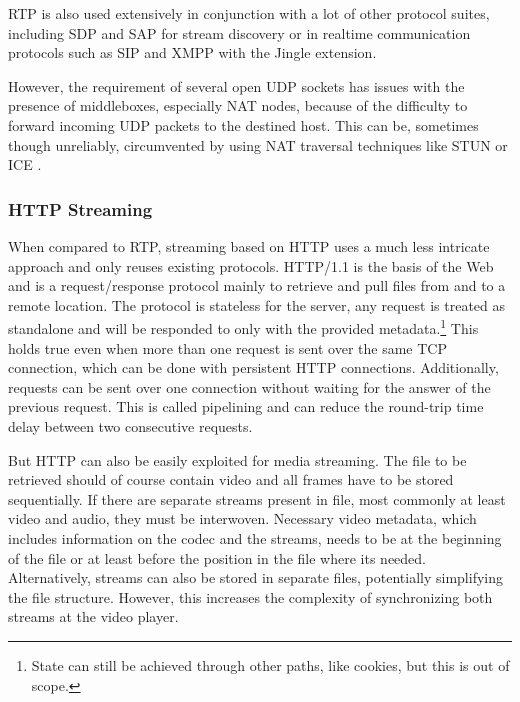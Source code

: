 \gls{RTP} is also used extensively in conjunction with a lot of other protocol suites, including \gls{SDP} \cite{rfc2327} and \gls{SAP} \cite{rfc2974} for stream discovery or in realtime communication protocols such as \gls{SIP} \cite{rfc3261} and \gls{XMPP} \cite{rfc6120,rfc6121} with the Jingle extension.

However, the requirement of several open \gls{UDP} sockets has issues with the presence of middleboxes, especially \gls{NAT} nodes, because of the difficulty to forward incoming \gls{UDP} packets to the destined host. This can be, sometimes though unreliably, circumvented by using \gls{NAT} traversal techniques like \gls{STUN} \cite{rfc5389} or \gls{ICE} \cite{rfc5245}.



\subsubsection{HTTP Streaming}

When compared to \gls{RTP}, streaming based on \gls{HTTP} uses a much less intricate approach and only reuses existing protocols. HTTP/1.1 \cite{rfc2616} is the basis of the Web and is a request/response protocol mainly to retrieve and pull files from and to a remote location. The protocol is stateless for the server, any request is treated as standalone and will be responded to only with the provided metadata.\footnote{State can still be achieved through other paths, like cookies, but this is out of scope.} This holds true even when more than one request is sent over the same TCP connection, which can be done with persistent \gls{HTTP} connections. Additionally, requests can be sent over one connection without waiting for the answer of the previous request. This is called pipelining and can reduce the round-trip time delay between two consecutive requests.


But \gls{HTTP} can also be easily exploited for media streaming. The file to be retrieved should of course contain video and all frames have to be stored sequentially. If there are separate streams present in file, most commonly at least video and audio, they must be interwoven.
Necessary video metadata, which includes information on the codec and the streams, needs to be at the beginning of the file or at least before the position in the file where its needed. 
Alternatively, streams can also be stored in separate files, potentially simplifying the file structure. However, this increases the complexity of synchronizing both streams at the video player.

